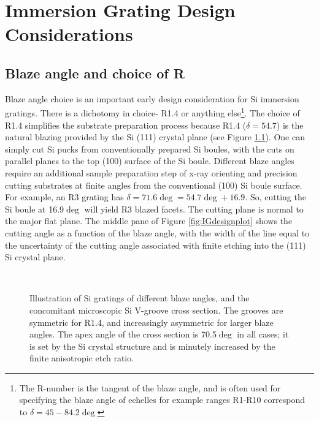 \chapter{Immersion Grating Design Considerations}

\section{Blaze angle and choice of R}
Blaze angle choice is an important early design consideration for Si immersion gratings.  There is a dichotomy in choice- R1.4 or anything else\footnote{The R-number is the tangent of the blaze angle, and is often used for specifying the blaze angle of echelles for example ranges R1-R10  correspond to $\delta= 45-84.2\deg$}.  The choice of R1.4 simplifies the substrate preparation process because R1.4 ($\delta=54.7$) is the natural blazing provided by the Si (111) crystal plane (see Figure \ref{fig:Rnum}).  One can simply cut Si pucks from conventionally prepared Si boules, with the cuts on parallel planes to the top (100) surface of the Si boule.  Different blaze angles require an additional sample preparation step of x-ray orienting and precision cutting substrates at finite angles from the conventional (100) Si boule surface.  For example, an R3 grating has $\delta=71.6 \deg=54.7\deg+16.9$.  So, cutting the Si boule at 16.9$\deg$ will yield R3 blazed facets.  The cutting plane is normal to the major flat plane.  The middle pane of Figure \ref{fig:IGdesignplot} shows the cutting angle as a function of the blaze angle, with the width of the line equal to the uncertainty of the cutting angle associated with finite etching into the (111) Si crystal plane.  


\begin{figure}[h!] 
\begin{center}
\ 
\caption[Illustration of Si gratings of different blaze angles]{Illustration of Si gratings of different blaze angles, and the concomitant microscopic Si V-groove cross section.  The grooves are symmetric for R1.4, and increasingly asymmetric for larger blaze angles.  The apex angle of the cross section is 70.5$\deg$ in all cases; it is set by the Si crystal structure and is minutely increased by the finite anisotropic etch ratio.}
\label{fig:Rnum}
\end{center}
\end{figure}


